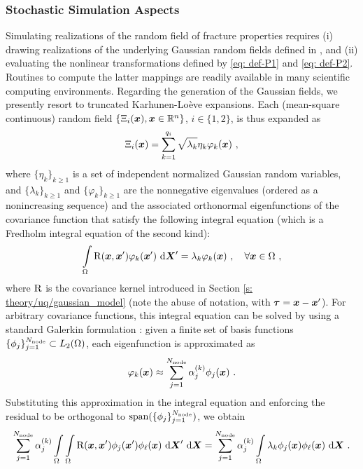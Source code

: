 \subsubsection{Stochastic Simulation Aspects}

Simulating realizations of the random field of fracture properties requires (i) drawing realizations of the underlying Gaussian random fields defined in , and (ii) evaluating the nonlinear transformations defined by \eqref{eq: def-P1} and \eqref{eq: def-P2}. Routines to compute the latter mappings are readily available in many scientific computing environments. Regarding the generation of the Gaussian fields, we presently resort to truncated Karhunen-Lo\`eve expansions. Each (mean-square continuous) random field $\{\Xi_i(\boldsymbol{x}), \boldsymbol{x} \in \mathbb{R}^n\}$, $i \in \{1,2\}$, is thus expanded as
\begin{align}
  \Xi_i(\boldsymbol{x}) = \sum\limits_{k=1}^{q_i} \sqrt{\lambda_k} \eta_k \varphi_k(\boldsymbol{x})~,
\end{align}
where $\{\eta_k\}_{k \geqslant 1}$ is a set of independent normalized Gaussian random variables, and $\{\lambda_k\}_{k \geqslant 1}$ and $\{\varphi_k\}_{k \geqslant 1}$ are the nonnegative eigenvalues (ordered as a nonincreasing sequence) and the associated orthonormal eigenfunctions of the covariance function that satisfy the following integral equation (which is a Fredholm integral equation of the second kind):
\begin{align}
  \int\limits_\Omega \operatorname{R}(\boldsymbol{x},\boldsymbol{x}')\varphi_k(\boldsymbol{x}') \text{ d}\boldsymbol{X}' = \lambda_k\varphi_k(\boldsymbol{x})~, \quad \forall \boldsymbol{x} \in \Omega~, \label{eq: FIE2}
\end{align}
where $\operatorname{R}$ is the covariance kernel introduced in Section \ref{s: theory/uq/gaussian_model} (note the abuse of notation, with $\boldsymbol{\tau} = \boldsymbol{x} - \boldsymbol{x}'$). For arbitrary covariance functions, this integral equation can be solved by using a standard Galerkin formulation \cite{GhanemSpanos,LMK2010}: given a finite set of basis functions $\{\phi_j\}_{j=1}^{N_\text{node}} \subset L_2(\Omega)$,
each eigenfunction is approximated as
\begin{align}
  \varphi_k(\boldsymbol{x}) \approx \sum_{j=1}^{N_{\text{node}}} \alpha_{j}^{(k)}\phi_j(\boldsymbol{x})~. \label{eq: eigenfunction approximation}
\end{align}
Substituting this approximation in the integral equation and enforcing the residual to be orthogonal to $\operatorname{span}(\{\phi_j\}_{j=1}^{N_\text{node}})$, we obtain
\begin{align}
  \sum_{j=1}^{N_{\text{node}}} \alpha_{j}^{(k)} \int\limits_\Omega \int\limits_\Omega \operatorname{R}(\boldsymbol{x},\boldsymbol{x}') \phi_j(\boldsymbol{x}')\phi_\ell(\boldsymbol{x}) \text{ d}\boldsymbol{X}' \text{ d}\boldsymbol{X} = \sum_{j=1}^{N_{\text{node}}} \alpha_{j}^{(k)} \int\limits_\Omega \lambda_k \phi_j(\boldsymbol{x})\phi_\ell(\boldsymbol{x}) \text{ d}\boldsymbol{X}~. \label{eq: gevp}
\end{align}

